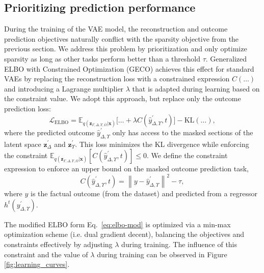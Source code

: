 \documentclass[doubleblind]{ecai}
\begin{document}
	\subsection{Prioritizing prediction performance} 
	\label{sec:geco}
	
	During the training of the VAE model, the reconstruction and outcome prediction objectives naturally conflict with the sparsity objective from the previous section. We address this problem by prioritization and only optimize sparsity as long as other tasks perform better than a threshold $\tau$. 
	Generalized ELBO with Constrained Optimization (GECO) \citet{JimenezRezende2018TamingV} achieves this effect for standard VAEs by replacing the reconstruction loss with a constrained expression $C(\dots)$ and introducing a Lagrange multiplier $\lambda$ that is adapted during learning based on the constraint value. We adopt this approach, but replace only the outcome prediction loss:
	\begin{equation}
		\mathcal{L}_{\mathrm{ELBO}} 
		=
		\mathbb{E}_{q(\mathbf{z}_{\Gamma,\Delta,\Upsilon,\Omega} | \mathbf{x})} 
		\Big[ 
		\dots 
		+ 
		\lambda C\left( \hat{y}_{\Delta , \Upsilon}^\prime, t \right)
		\Big] 
		- 
		\mathrm{KL}(\dots)
		\label{eq:elbo-mod}
		,
	\end{equation}
	where the predicted outcome $\hat{y}_{\Delta , \Upsilon}^\prime$ only has access to the masked sections of the latent space $\mathbf{z}_\Delta^\prime$ and $\mathbf{z}_\Upsilon^\prime$.
	This loss minimizes the KL divergence while enforcing the constraint $\mathbb{E}_{q(\mathbf{z}_{\Gamma,\Delta,\Upsilon,\Omega} | \mathbf{x})} \left[ C\left( \hat{y}_{\Delta , \Upsilon}^\prime, t \right) \right] \leq 0$. We define the constraint expression to enforce an upper bound on the masked outcome prediction task, 
	\begin{equation}
		C\left( \hat{y}_{\Delta , \Upsilon}^\prime, t \right) 
		=  
		\left\| y -  \hat{y}_{\Delta , \Upsilon}^\prime \right \|^2 - \tau
		,
	\end{equation}
	where $y$ is the factual outcome (from the dataset) and predicted from a regressor $h^t({y}_{\Delta , \Upsilon}^\prime)$.
	
	
	The modified ELBO form Eq.\ \eqref{eq:elbo-mod} is optimized via a min-max optimization scheme (i.e. dual gradient decent), balancing the objectives and constraints effectively by adjusting $\lambda$ during training. The influence of this constraint and the value of $\lambda$ during training can be observed in Figure \ref{fig:learning_curves}.
	
\end{document}
